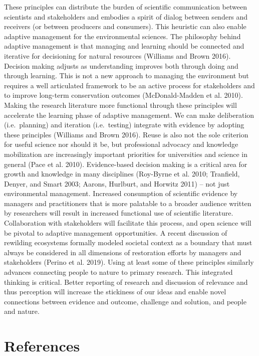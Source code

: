 \documentclass[fleqn,10pt]{wlpeerj} %
\begin{document}
These principles can distribute the burden of scientific communication
between scientists and stakeholders and embodies a spirit of dialog
between senders and receivers (or between producers and consumers). This
heuristic can also enable adaptive management for the environmental
sciences. The philosophy behind adaptive management is that managing and
learning should be connected and iterative for decisioning for natural
resources (Williams and Brown 2016). Decision making adjusts as
understanding improves both through doing and through learning. This is
not a new approach to managing the environment but requires a well
articulated framework to be an active process for stakeholders and to
improve long-term conservation outcomes (McDonald-Madden et al. 2010).
Making the research literature more functional through these principles
will accelerate the learning phase of adaptive management. We can make
deliberation (i.e.~planning) and iteration (i.e.~testing) integrate with
evidence by adopting these principles (Williams and Brown 2016). Reuse
is also not the sole criterion for useful science nor should it be, but
professional advocacy and knowledge mobilization are increasingly
important priorities for universities and science in general (Pace et
al. 2010). Evidence-based decision making is a critical area for growth
and knowledge in many disciplines (Roy-Byrne et al. 2010; Tranfield,
Denyer, and Smart 2003; Aarons, Hurlburt, and Horwitz 2011) -- not just
environmental management. Increased consumption of scientific evidence
by managers and practitioners that is more palatable to a broader
audience written by researchers will result in increased functional use
of scientific literature. Collaboration with stakeholders will
facilitate this process, and open science will be pivotal to adaptive
management opportunities. A recent discussion of rewilding ecosystems
formally modeled societal context as a boundary that must always be
considered in all dimensions of restoration efforts by managers and
stakeholders (Perino et al. 2019). Using at least some of these
principles similarly advances connecting people to nature to primary
research. This integrated thinking is critical. Better reporting of
research and discussion of relevance and thus perception will increase
the stickiness of our ideas and enable novel connections between
evidence and outcome, challenge and solution, and people and nature.

\hypertarget{references}{%
\section*{References}\label{references}}
\end{document}
